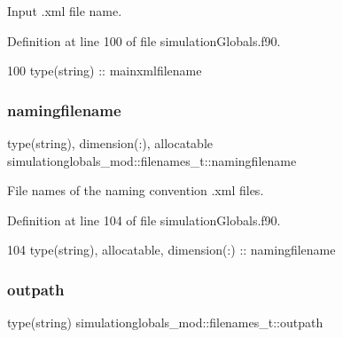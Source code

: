 Input .xml file name. 



Definition at line 100 of file simulation\+Globals.\+f90.


\begin{DoxyCode}
100         \textcolor{keywordtype}{type}(string) :: mainxmlfilename
\end{DoxyCode}
\mbox{\label{structsimulationglobals__mod_1_1filenames__t_ab9bfe3490032ac0fe0ff585f4ccf81ba}} 
\subsubsection{\texorpdfstring{namingfilename}{namingfilename}}
{\footnotesize\ttfamily type(string), dimension(\+:), allocatable simulationglobals\+\_\+mod\+::filenames\+\_\+t\+::namingfilename\hspace{0.3cm}{\ttfamily [private]}}



File names of the naming convention .xml files. 



Definition at line 104 of file simulation\+Globals.\+f90.


\begin{DoxyCode}
104         \textcolor{keywordtype}{type}(string), \textcolor{keywordtype}{allocatable}, \textcolor{keywordtype}{dimension(:)} :: namingfilename
\end{DoxyCode}
\mbox{\label{structsimulationglobals__mod_1_1filenames__t_aa8af9fb10dcd5d2f5dfc0fe299a16755}} 
\subsubsection{\texorpdfstring{outpath}{outpath}}
{\footnotesize\ttfamily type(string) simulationglobals\+\_\+mod\+::filenames\+\_\+t\+::outpath\hspace{0.3cm}{\ttfamily [private]}}



